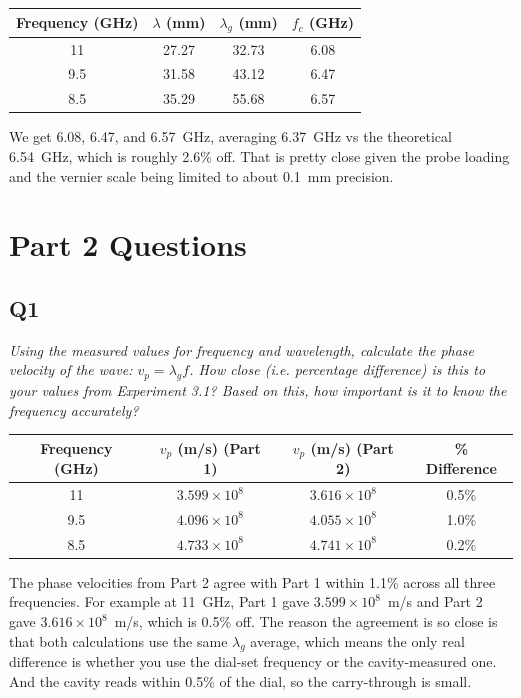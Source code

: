 \documentclass[11pt,letterpaper]{article}
\begin{document}
\begin{center}
\begin{tabular}{cccc}
\toprule
Frequency (GHz) & $\lambda$ (mm) & $\lambda_g$ (mm) & $f_c$ (GHz) \\
\midrule
11   & 27.27 & 32.73 & 6.08 \\
9.5  & 31.58 & 43.12 & 6.47 \\
8.5  & 35.29 & 55.68 & 6.57 \\
\bottomrule
\end{tabular}
\end{center}

We get 6.08, 6.47, and 6.57~GHz, averaging 6.37~GHz vs the theoretical 6.54~GHz, which is roughly 2.6\% off. That is pretty close given the probe loading and the vernier scale being limited to about 0.1~mm precision.

\newpage

\section{Part 2 Questions}

\subsection*{Q1}
\textit{Using the measured values for frequency and wavelength, calculate the phase velocity of the wave: $v_p = \lambda_g f$. How close (i.e. percentage difference) is this to your values from Experiment 3.1? Based on this, how important is it to know the frequency accurately?}

\begin{center}
\begin{tabular}{cccc}
\toprule
Frequency (GHz) & $v_p$ (m/s) (Part 1) & $v_p$ (m/s) (Part 2) & \% Difference \\
\midrule
11   & $3.599\times10^{8}$ & $3.616\times10^{8}$ & 0.5\% \\
9.5  & $4.096\times10^{8}$ & $4.055\times10^{8}$ & 1.0\% \\
8.5  & $4.733\times10^{8}$ & $4.741\times10^{8}$ & 0.2\% \\
\bottomrule
\end{tabular}
\end{center}

The phase velocities from Part 2 agree with Part 1 within 1.1\% across all three frequencies. For example at 11~GHz, Part 1 gave $3.599\times10^{8}$~m/s and Part 2 gave $3.616\times10^{8}$~m/s, which is 0.5\% off. The reason the agreement is so close is that both calculations use the same $\lambda_g$ average, which means the only real difference is whether you use the dial-set frequency or the cavity-measured one. And the cavity reads within 0.5\% of the dial, so the carry-through is small.
\end{document}
